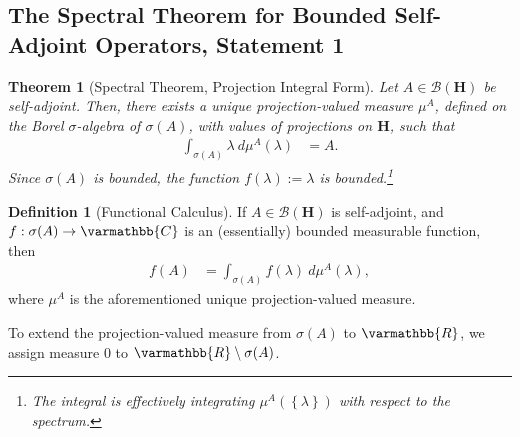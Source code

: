 \documentclass[12pt]{extarticle}
\newcommand{\R}{\varmathbb{R}}
\newcommand{\C}{\varmathbb{C}}
\newcommand{\set}[1]{\left\{#1\right\}}
\theoremstyle{plain}
\newtheorem*{theorem}{Theorem}%
\theoremstyle{definition}
\newtheorem*{definition}{Definition}
\theoremstyle{remark}
\renewcommand{\newline}{\hfill\break}
\begin{document}
  \subsection{The Spectral Theorem for Bounded Self-Adjoint Operators, Statement 1}%
  \begin{theorem}[Spectral Theorem, Projection Integral Form]
    Let $A\in \mathcal{B}\left(\mathbf{H}\right)$ be self-adjoint. Then, there exists a unique projection-valued measure $\mu^{A}$, defined on the Borel $\sigma$-algebra of $\sigma(A)$, with values of projections on $\mathbf{H}$, such that
    \begin{align*}
      \int_{\sigma(A)}^{} \lambda\:d\mu^{A}(\lambda) &= A.
    \end{align*}
    Since $\sigma(A)$ is bounded, the function $f(\lambda) := \lambda$ is bounded.\footnote{The integral is effectively integrating $\mu^{A}\left(\set{\lambda}\right)$ with respect to the spectrum.}
  \end{theorem}
  \begin{definition}[Functional Calculus]
    If $A\in \mathcal{B}\left(\mathbf{H}\right)$ is self-adjoint, and $f: \sigma(A)\rightarrow \C$ is an (essentially) bounded measurable function, then
    \begin{align*}
      f(A) &= \int_{\sigma(A)}^{} f(\lambda)\:d\mu^{A}(\lambda),
    \end{align*}
    where $\mu^{A}$ is the aforementioned unique projection-valued measure.
  \end{definition}
  To extend the projection-valued measure from $\sigma(A)$ to $\R$, we assign measure $0$ to $\R\setminus \sigma(A)$.\newline
\end{document}
